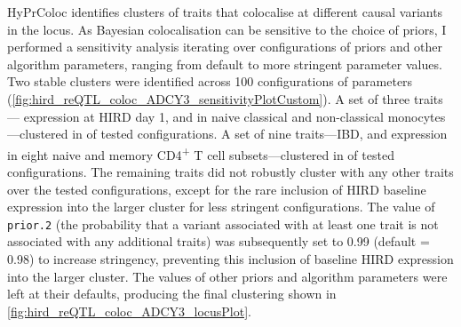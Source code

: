 {HyPrColoc} identifies clusters of traits that colocalise at different causal variants in the locus.
As Bayesian colocalisation can be sensitive to the choice of priors,
I performed a sensitivity analysis iterating over configurations of priors and other algorithm parameters, ranging from default to more stringent parameter values.
Two stable clusters were identified across 100 configurations of parameters (\cref{fig:hird_reQTL_coloc_ADCY3_sensitivityPlotCustom}).
A set of three traits--- expression at \gls{HIRD} day 1, and in naive classical and non-classical monocytes---clustered in  of tested configurations.
A set of nine traits---\gls{IBD}, and expression in eight naive and memory CD4\textsuperscript{+} T cell subsets---clustered in  of tested configurations.
The remaining traits did not robustly cluster with any other traits over the tested configurations,
except for the rare inclusion of \gls{HIRD} baseline  expression into the larger cluster for less stringent configurations.
%
%
%
%
%
The value of \texttt{prior.2} (the probability that a variant associated with at least one trait is not associated with any additional traits) was subsequently set to 0.99 (default = 0.98) to increase stringency, preventing this inclusion of baseline \gls{HIRD} expression into the larger cluster.
The values of other priors and algorithm parameters were left at their defaults, producing the final clustering shown in \cref{fig:hird_reQTL_coloc_ADCY3_locusPlot}.

